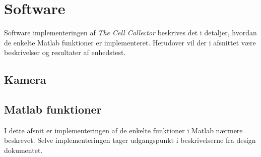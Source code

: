 \section{Software}
Software implementeringen af \textit{The Cell Collector} beskrives det i detaljer, hvordan de enkelte Matlab funktioner er implementeret. Herudover vil der i afsnittet være beskrivelser og resultater af enhedstest. 
 
\subsection{Kamera}



\newpage
\subsection{Matlab funktioner}
I dette afsnit er implementeringen af de enkelte funktioner i Matlab nærmere beskrevet. Selve implementeringen tager udgangspunkt i beskrivelserne fra design dokumentet. %





 
\newpage
